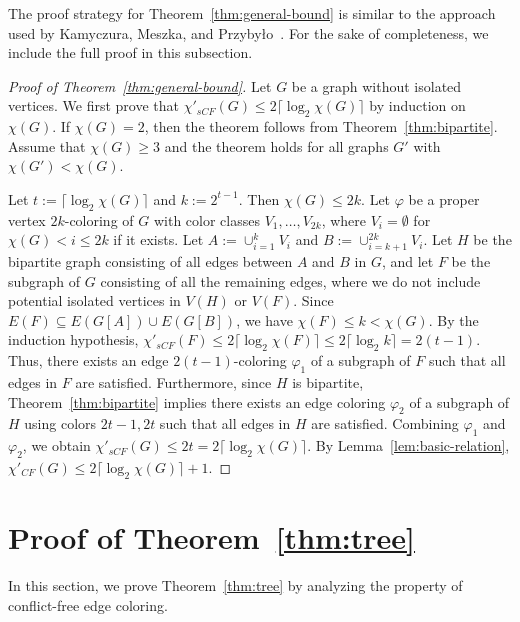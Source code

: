 \documentclass[11pt]{article}
\theoremstyle{plain}
\numberwithin{equation}{section}
\begin{document}
The proof strategy for Theorem~\ref{thm:general-bound} is similar to the approach used by Kamyczura, Meszka, and Przyby{\l}o~\cite{KamyczuraMeszkaPrzybylo2024}. For the sake of completeness, we include the full proof in this subsection.

\begin{proof}[Proof of Theorem~\ref{thm:general-bound}]
Let $G$ be a graph without isolated vertices. We first prove that $\chi'_{sCF}(G)\le 2\lceil\log_2\chi(G)\rceil$ by induction on $\chi(G)$. If $\chi(G)=2$, then the theorem follows from Theorem~\ref{thm:bipartite}. Assume that $\chi(G)\ge 3$ and the theorem holds for all graphs $G'$ with $\chi(G')<\chi(G)$.

Let $t:=\lceil\log_2\chi(G)\rceil$ and $k:=2^{t-1}$. Then $\chi(G)\le 2k$. Let $\varphi$ be a proper vertex $2k$-coloring of $G$ with color classes $V_1,\ldots,V_{2k}$, where $V_i=\emptyset$ for $\chi(G)<i\le 2k$ if it exists. Let $A:= \cup_{i=1}^k V_i$ and $B:= \cup_{i=k+1}^{2k} V_i$. Let $H$ be the bipartite graph consisting of all edges between $A$ and $B$ in $G$, and let $F$ be the subgraph of $G$ consisting of all the remaining edges, where we do not include potential isolated vertices in $V(H)$ or $V(F)$. Since $E(F)\subseteq E(G[A])\cup E(G[B])$, we have $\chi(F)\le k<\chi(G)$. By the induction hypothesis, $\chi'_{sCF}(F)\le 2\lceil\log_2 \chi(F)\rceil\le 2\lceil\log_2 k\rceil=2(t-1)$. Thus, there exists an edge $2(t-1)$-coloring $\varphi_1$ of a subgraph of $F$ such that all edges in $F$ are satisfied. Furthermore, since $H$ is bipartite, Theorem~\ref{thm:bipartite} implies there exists an edge coloring $\varphi_2$ of  a subgraph of $H$ using colors $2t-1,2t$ such that all edges in $H$ are satisfied. Combining $\varphi_1$ and $\varphi_2$, we obtain $\chi'_{sCF}(G)\le 2t=2\lceil \log_2\chi(G)\rceil$. By Lemma~\ref{lem:basic-relation}, $\chi'_{CF}(G)\le 2\lceil \log_2\chi(G)\rceil+1$.
\end{proof}


\section{Proof of Theorem~\ref{thm:tree}}\label{sec:tree}

In this section, we prove Theorem~\ref{thm:tree} by analyzing the property of conflict-free edge coloring.
\end{document}
